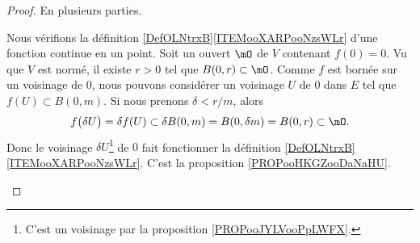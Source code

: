 \begin{proof}
	En plusieurs parties.
	\begin{subproof}
		Nous vérifions la définition \ref{DefOLNtrxB}\ref{ITEMooXARPooNzsWLr} d'une fonction continue en un point. Soit un ouvert \( \mO\) de \( V\) contenant \( f(0)=0\). Vu que \( V\) est normé, il existe \( r>0\) tel que \( B(0,r)\subset\mO\). Comme \( f\) est bornée sur un voisinage de \( 0\), nous pouvons considérer un voisinage \( U\) de \( 0\) dans \( E\) tel que \( f(U)\subset B(0,m)\). Si nous prenons \(\delta<r/m\), alors
		\begin{equation}
			f\big( \delta U \big)=\delta f(U)\subset \delta B(0,m)=B(0,\delta m)=B(0,r)\subset \mO.
		\end{equation}
		Donc le voisinage \( \delta U\)\footnote{C'est un voisinage par la proposition \ref{PROPooJYLVooPpLWFX}.} de \( 0\) fait fonctionner la définition \ref{DefOLNtrxB}\ref{ITEMooXARPooNzsWLr}.
		C'est la proposition \ref{PROPooHKGZooDaNaHU}.
	\end{subproof}
\end{proof}
